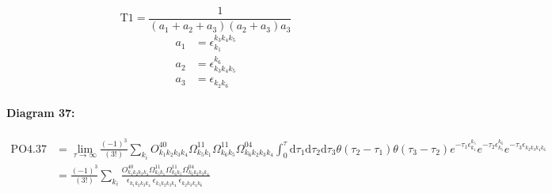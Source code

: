 \documentclass[10pt,a4paper]{article}
\begin{document}
\begin{equation}
\text{T}1 = \frac{1}{(a_1+ a_2+ a_3)(a_2+ a_3)a_3}\end{equation}
\begin{align*}
a_1 &= \epsilon^{k_{3}k_{4}k_{5}}_{k_{1}}\\
a_2 &= \epsilon^{k_{6}}_{k_{3}k_{4}k_{5}}\\
a_3 &= \epsilon^{}_{k_{2}k_{6}}
\end{align*}
\paragraph{Diagram 37:}
\begin{align}
\text{PO}4.37
&= \lim\limits_{\tau \to \infty}\frac{(-1)^3 }{(3!)}\sum_{k_i}O^{40}_{k_{1}k_{2}k_{3}k_{4}} \Omega^{11}_{k_{5}k_{1}} \Omega^{11}_{k_{6}k_{5}} \Omega^{04}_{k_{6}k_{2}k_{3}k_{4}} \int_{0}^{\tau}\mathrm{d}\tau_1\mathrm{d}\tau_2\mathrm{d}\tau_3\theta(\tau_2-\tau_1) \theta(\tau_3-\tau_2) e^{-\tau_1 \epsilon^{k_{5}}_{k_{1}}}e^{-\tau_2 \epsilon^{k_{6}}_{k_{5}}}e^{-\tau_3 \epsilon^{}_{k_{2}k_{3}k_{4}k_{6}}}
 \nonumber \\
&= \frac{(-1)^3 }{(3!)}\sum_{k_i}\frac{O^{40}_{k_{1}k_{2}k_{3}k_{4}} \Omega^{11}_{k_{5}k_{1}} \Omega^{11}_{k_{6}k_{5}} \Omega^{04}_{k_{6}k_{2}k_{3}k_{4}} }{\epsilon^{}_{k_{1}k_{2}k_{3}k_{4}}\ \epsilon^{}_{k_{5}k_{2}k_{3}k_{4}}\ \epsilon^{}_{k_{2}k_{3}k_{4}k_{6}}\ } 
\end{align}
\end{document}
